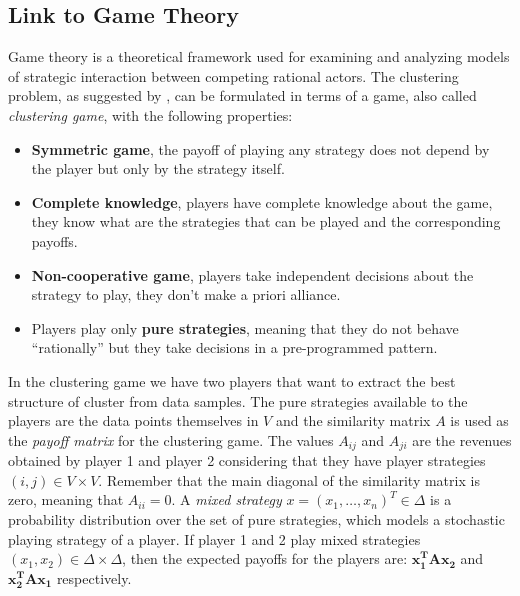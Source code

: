 \subsection{Link to Game Theory}
Game theory is a theoretical framework used for examining and analyzing models of strategic interaction between competing rational actors. The clustering problem, as suggested by \citeauthor{dominantset}, 
can be formulated in terms of a game, also called \textit{clustering game}, with the following properties:
\begin{itemize}
	\item \textbf{Symmetric game}, the payoff of playing any strategy does not depend by the player but only by the strategy itself.
	
	\item \textbf{Complete knowledge}, players have complete knowledge about the game, they know what are the strategies that can be played and the corresponding payoffs.
	
	\item \textbf{Non-cooperative game}, players take independent decisions about the strategy to play, they don't make a priori alliance.
	
	\item Players play only \textbf{pure strategies}, meaning that they do not behave “rationally” but they take decisions in a pre-programmed pattern.
\end{itemize}
In the clustering game we have two players that want to extract the best structure of cluster from data samples. The pure strategies available to the players are the data points themselves in $V$ and the similarity matrix $A$ is used as the \textit{payoff matrix} for the clustering game. The values $A_{ij}$ and $A_{ji}$ are the revenues obtained by player 1 and player 2 considering that they have player strategies $(i,j) \in V\times V$. Remember that the main diagonal of the similarity matrix is zero, meaning that $A_{ii}=0$.
A \textit{mixed strategy} $x=(x_1, \dots, x_n)^T \in \Delta$ is a probability distribution over the set of pure strategies, which models a stochastic playing strategy of a player. If player 1 and 2 play mixed strategies $(x_1, x_2) \in \Delta \times \Delta$, then the expected payoffs for the players are: $\mathbf{x_1^TAx_2}$ and $\mathbf{x_2^TAx_1}$ respectively.

